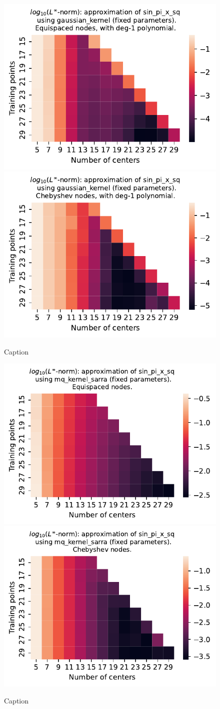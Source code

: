\documentclass[12pt]{report} %
\begin{document}
\begin{figure}[ht]
    \centering
    
    \includegraphics[width=.49\textwidth]{imagenes/experiments/1d/least_squares/opt-sin_pi_x_sq-Kgaussian_kernel-Poly-Equi.pdf}
    \includegraphics[width=.49\textwidth]{imagenes/experiments/1d/least_squares/opt-sin_pi_x_sq-Kgaussian_kernel-Poly-Cheb.pdf}
    \caption{Caption}
    \label{fig:opt-sin-pi-x-sq-gaussian-poly}
\end{figure}


\begin{figure}[ht]
    \centering
    
    \includegraphics[width=.49\textwidth]{imagenes/experiments/1d/least_squares/opt-sin_pi_x_sq-Kmq_kernel_sarra-Equi.pdf}
    \includegraphics[width=.49\textwidth]{imagenes/experiments/1d/least_squares/opt-sin_pi_x_sq-Kmq_kernel_sarra-Cheb.pdf}
    \caption{Caption}
    \label{fig:opt-sin-pi-x-sq-sarra}
\end{figure}
\end{document}
